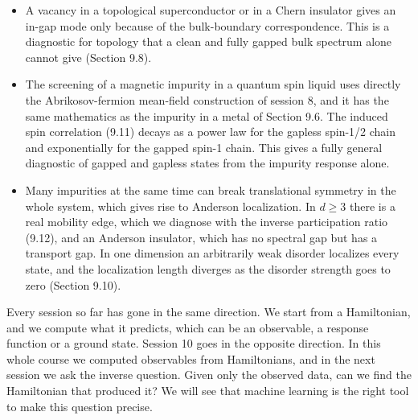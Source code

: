 \begin{itemize}
  Its energy crosses zero at a real quantum phase transition, where the fermion parity of the electrons
changes and their spin goes as $S_{\rm tot}=0 \to 1/2$, while a
  non-magnetic impurity leaves the spectrum almost unchanged.
\item A vacancy in a topological superconductor or in a Chern insulator gives an in-gap mode only
  because of the bulk-boundary correspondence. This is a diagnostic for topology that a clean and
  fully gapped bulk spectrum alone cannot give (Section 9.8).
\item The screening of a magnetic impurity in a quantum spin liquid uses directly the
  Abrikosov-fermion mean-field construction of session 8, and it has the same mathematics as the
  impurity in a metal of Section 9.6. The induced spin correlation (9.11) decays as a power law for
  the gapless spin-1/2 chain and exponentially for the gapped spin-1 chain. This gives a fully
  general diagnostic of gapped and gapless states from the impurity response alone.
\item Many impurities at the same time can break translational symmetry in the whole system, which
  gives rise to Anderson localization. In $d\geq3$ there is a real mobility edge, which we diagnose
  with the inverse participation ratio (9.12), and an Anderson insulator, which has no spectral gap but
  has a transport gap. In one dimension an arbitrarily weak disorder localizes every state, and the
  localization length diverges as the disorder strength goes to zero (Section 9.10).
\end{itemize}

Every session so far has gone in the same direction. We start from a Hamiltonian, and we compute what
it predicts, which can be an observable, a response function or a ground state. Session 10 goes in
the opposite direction. In this whole course we computed observables from Hamiltonians, and in the
next session we ask the inverse question. Given only the observed data, can we find the Hamiltonian
that produced it? We will see that machine learning is the right tool to make this question precise.
